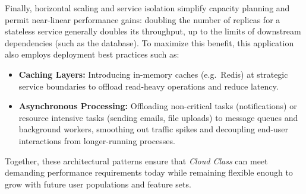 Finally, horizontal scaling and service isolation simplify capacity planning and permit near-linear performance gains: doubling the number of replicas for a stateless service generally doubles its throughput, up to the limits of downstream dependencies (such as the database).  To maximize this benefit, this application also employs deployment best practices such as:

\begin{itemize}
  \item \textbf{Caching Layers:} Introducing in-memory caches (e.g.\ Redis) at strategic service boundaries to offload read-heavy operations and reduce latency.
  \item \textbf{Asynchronous Processing:} Offloading non-critical tasks (notifications) or resource intensive tasks (sending emails, file uploads) to message queues and background workers, smoothing out traffic spikes and decoupling end-user interactions from longer-running processes.
\end{itemize}

Together, these architectural patterns ensure that \emph{Cloud Class} can meet demanding performance requirements today while remaining flexible enough to grow with future user populations and feature sets.
